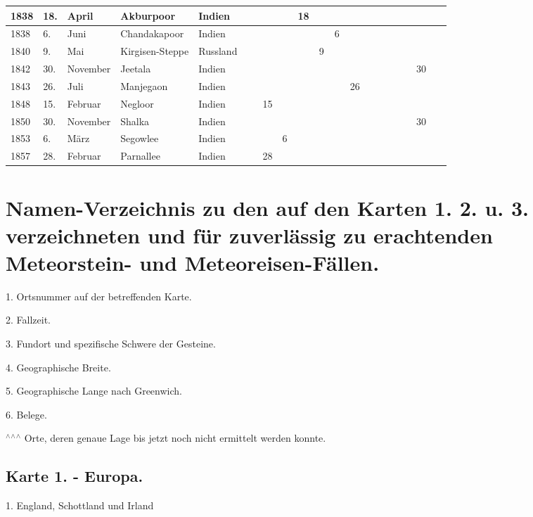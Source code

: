 \documentclass[a4paper, 11pt, oneside, polutonikogreek, german]{article}
\begin{document}
\begin{table}[!ht]
\begin{tabular}{|l|l|l|l|l|l|l|l|l|l|l|l|l|l|l|l|l|}
        1838 & 18. & April & Akburpoor & Indien & ~ & ~ & ~ & 18 & ~ & ~ & ~ & ~ & ~ & ~ & ~ & ~ \\ \hline
        1838 & 6. & Juni & Chandakapoor & Indien & ~ & ~ & ~ & ~ & ~ & 6 & ~ & ~ & ~ & ~ & ~ & ~ \\ \hline
        1840 & 9. & Mai & Kirgisen-Steppe & Russland & ~ & ~ & ~ & ~ & 9 & ~ & ~ & ~ & ~ & ~ & ~ & ~ \\ \hline
        1842 & 30. & November & Jeetala & Indien & ~ & ~ & ~ & ~ & ~ & ~ & ~ & ~ & ~ & ~ & 30 & ~ \\ \hline
        1843 & 26. & Juli & Manjegaon & Indien & ~ & ~ & ~ & ~ & ~ & ~ & 26 & ~ & ~ & ~ & ~ & ~ \\ \hline
        1848 & 15. & Februar & Negloor & Indien & ~ & 15 & ~ & ~ & ~ & ~ & ~ & ~ & ~ & ~ & ~ & ~ \\ \hline
        1850 & 30. & November & Shalka & Indien & ~ & ~ & ~ & ~ & ~ & ~ & ~ & ~ & ~ & ~ & 30 & ~ \\ \hline
        1853 & 6. & März & Segowlee & Indien & ~ & ~ & 6 & ~ & ~ & ~ & ~ & ~ & ~ & ~ & ~ & ~ \\ \hline
        1857 & 28. & Februar & Parnallee & Indien & ~ & 28 \\ \hline
    \end{tabular}
\end{table}
\clearpage
\section{Namen-Verzeichnis zu den auf den Karten 1. 2. u. 3. verzeichneten und für zuverlässig zu erachtenden Meteorstein- und Meteoreisen-Fällen.}
1. Ortsnummer auf der betreffenden Karte.

2. Fallzeit.

3. Fundort und spezifische Schwere der Gesteine.

4. Geographische Breite.

5. Geographische Lange nach Greenwich.

6. Belege.

$^\wedge$$^\wedge$$^\wedge$ Orte, deren genaue Lage bis jetzt noch nicht ermittelt werden konnte.

\subsection{Karte 1. - Europa.}
1. England, Schottland und Irland
\end{document}
